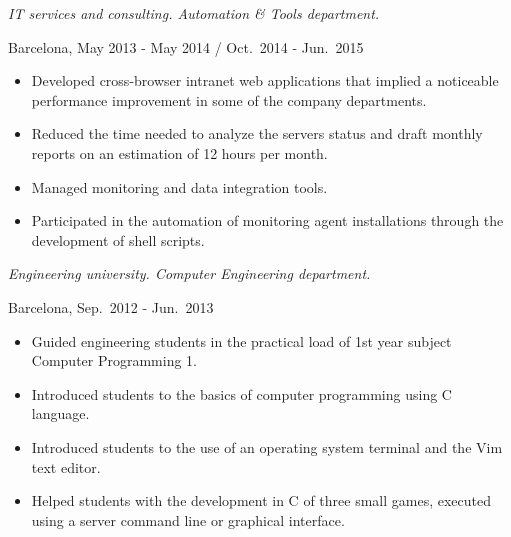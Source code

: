 \begin{description}[itemsep=15pt]
    \item[\href{http://www.t-systems.es}{T-Systems Iberia}, Intern] \hfill

        \emph{IT services and consulting. Automation \& Tools department.}

        Barcelona, May 2013 - May 2014 / Oct.\ 2014 - Jun.\ 2015
        \begin{itemize}[itemsep=0pt]
            \item Developed cross-browser intranet web applications that implied a noticeable performance improvement in some of the company departments.
            \item Reduced the time needed to analyze the servers status and draft monthly reports on an estimation of 12 hours per month.
            \item Managed monitoring and data integration tools.
            \item Participated in the automation of monitoring agent installations through the development of shell scripts.
        \end{itemize}

    \item[\href{http://www.salleurl.edu}{La Salle Campus}, Teaching Assistant in Computer Programming 1] \hfill

        \emph{Engineering university. Computer Engineering department.}

        Barcelona, Sep.\ 2012 - Jun.\ 2013
        \begin{itemize}[itemsep=0pt]
            \item Guided engineering students in the practical load of 1st year subject Computer Programming 1.
            \item Introduced students to the basics of computer programming using C language.
            \item Introduced students to the use of an operating system terminal and the Vim text editor.
            \item Helped students with the development in C of three small games, executed using a server command line or graphical interface.
        \end{itemize}




\end{description}
